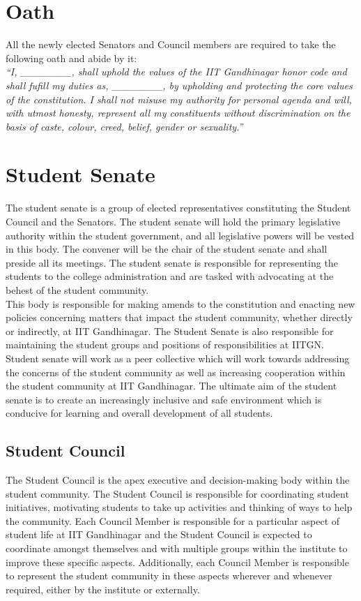 \documentclass[12pt]{article}
\begin{document}
\section{Oath}
All the newly elected Senators and Council members are required to take the following oath and abide by it:\\

\noindent \textit{``I, \_\_\_\_\_\_\_, shall uphold the values of the IIT Gandhinagar honor code and shall fufill my duties as, \_\_\_\_\_\_\_, by upholding and protecting the core values of the constitution. I shall not misuse my authority for personal agenda and will, with utmost honesty, represent all my constituents without discrimination on the basis of caste, colour, creed, belief, gender or sexuality.''}


\section{Student Senate}
The student senate is a group of elected representatives constituting the Student Council and the Senators. The student senate will hold the primary legislative authority within the student government, and all legislative powers will be vested in this body. The convener will be the chair of the student senate and shall preside all its meetings. The student senate is responsible for representing the students to the college administration and are tasked with advocating at the behest of the student community. \\

\noindent This body is responsible for making amends to the constitution and enacting new policies concerning matters that impact the student community, whether directly or indirectly, at IIT Gandhinagar. The Student Senate is also responsible for maintaining the student groups and positions of responsibilities at IITGN.  Student senate will work as a peer collective which will work towards addressing the concerns of the student community as well as increasing cooperation within the student community at IIT Gandhinagar. The ultimate aim of the student senate is to create an increasingly inclusive and safe environment which is conducive for learning and overall development of all students.

\subsection{Student Council}
\noindent The Student Council is the apex executive and decision-making body within the student community. The Student Council is responsible for coordinating student initiatives, motivating students to take up activities and thinking of ways to help the community. Each Council Member is responsible for a particular aspect of student life at IIT Gandhinagar and the Student Council is expected to coordinate amongst themselves and with multiple groups within the institute to improve these specific aspects. Additionally, each Council Member is responsible to represent the student community in these aspects wherever and whenever required, either by the institute or externally. \\
\end{document}
